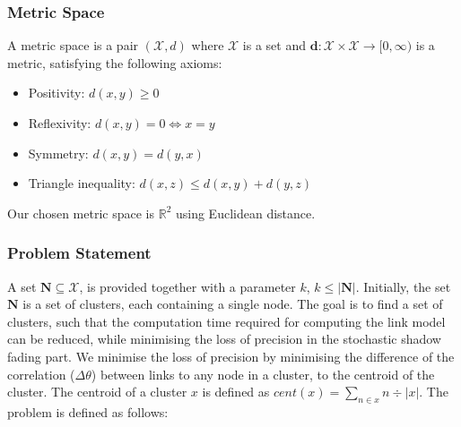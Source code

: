 \subsubsection{Metric Space}
A metric space is a pair $( \mathcal{X}, d )$ where $ \mathcal{X} $ is a set and $\textbf{d}:\mathcal{X} \times \mathcal{X} \rightarrow [0, \infty )$ is a metric, satisfying the following axioms:

\begin{itemize}
    \item Positivity: $d(x, y) \geq 0$
    \item Reflexivity: $d(x, y) = 0 \Longleftrightarrow x = y$
    \item Symmetry: $d(x, y) = d(y, x)$
    \item Triangle inequality: $d(x, z) \leq d(x, y) + d(y, z)$
\end{itemize}

Our chosen metric space is $\mathbb{R}^2$ using Euclidean distance.


\subsubsection{Problem Statement}

A set $\textbf{N} \subseteq \mathcal{X}$, is provided together with a parameter $k$, $k \leq |\textbf{N}|$. Initially, the set $\textbf{N}$ is a set of clusters, each containing a single node. The goal is to find a set of clusters, such that the computation time required for computing the link model can be reduced, while minimising the loss of precision in the stochastic shadow fading part. We minimise the loss of precision by minimising the difference of the correlation ($\Delta\theta$) between links to any node in a cluster, to the centroid of the cluster. The centroid of a cluster $x$ is defined as $cent(x) = \sum\limits_{n \in x} n \div |x|$. \smallbreak
%
The problem is defined as follows:\smallbreak




